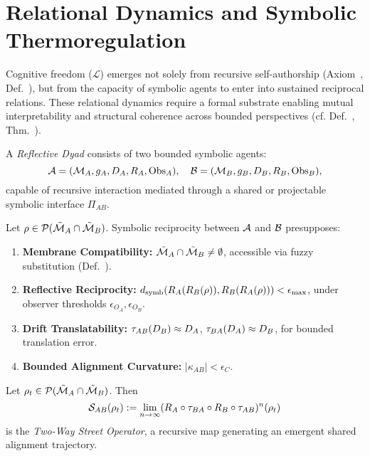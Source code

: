 \section{Relational Dynamics and Symbolic Thermoregulation}
\label{sec:bk9_relational_dynamics_and_symbolic_thermoregulation}
Cognitive freedom (\( \mathcal{L} \)) emerges not solely from recursive self-authorship (Axiom~, Def.~), but from the capacity of symbolic agents to enter into sustained reciprocal relations. These relational dynamics require a formal substrate enabling mutual interpretability and structural coherence across bounded perspectives (cf. Def.~, Thm.~).
\begin{definition}
\label{definition:bk9_reflective_dyad}
A \emph{Reflective Dyad} consists of two bounded symbolic agents:
\[
\mathcal{A} = (\mathcal{M}_A, g_A, D_A, R_A, \mathrm{Obs}_A), \quad
\mathcal{B} = (\mathcal{M}_B, g_B, D_B, R_B, \mathrm{Obs}_B),
\]
capable of recursive interaction mediated through a shared or projectable symbolic interface \( \Pi_{AB} \).
\end{definition}
\begin{axiom}
\label{axiom:bk9_preconditions_for_reciprocal_cognition}
Let \( \rho \in \mathcal{P}(\tilde{\mathcal{M}}_A \cap \tilde{\mathcal{M}}_B) \). Symbolic reciprocity between \( \mathcal{A} \) and \( \mathcal{B} \) presupposes:
\begin{enumerate}[label=(\roman*)]
    \item \textbf{Membrane Compatibility:} \( \tilde{\mathcal{M}}_A \cap \tilde{\mathcal{M}}_B \neq \emptyset \), accessible via fuzzy substitution (Def.~).
    \item \textbf{Reflective Reciprocity:} \( d_\text{symb}(R_A(R_B(\rho)), R_B(R_A(\rho))) < \epsilon_{\max} \), under observer thresholds \( \epsilon_{O_A}, \epsilon_{O_B} \).
    \item \textbf{Drift Translatability:} \( \tau_{AB}(D_B) \approx D_A \), \( \tau_{BA}(D_A) \approx D_B \), for bounded translation error.
    \item \textbf{Bounded Alignment Curvature:} \( |\kappa_{AB}| < \epsilon_C \).
\end{enumerate}
\end{axiom}
\begin{definition}
\label{definition:bk9_two_way_street_operator}
Let \( \rho_t \in \mathcal{P}(\tilde{\mathcal{M}}_A \cap \tilde{\mathcal{M}}_B) \). Then
\[
\mathcal{S}_{AB}(\rho_t) := \lim_{n \to \infty} (R_A \circ \tau_{BA} \circ R_B \circ \tau_{AB})^n(\rho_t)
\]
is the \emph{Two-Way Street Operator}, a recursive map generating an emergent shared alignment trajectory.
\end{definition}
